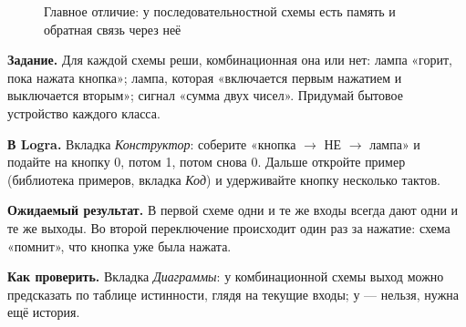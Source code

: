\begin{figure}[H]
\centering
{}
\caption{Главное отличие: у последовательностной схемы есть память и обратная
связь через неё}
\label{fig:comb_vs_seq}
\end{figure}

\begin{diybox}
\textbf{Задание.}  Для каждой схемы реши, комбинационная она или нет:
лампа «горит, пока нажата кнопка»; лампа, которая «включается первым
нажатием и выключается вторым»; сигнал «сумма двух чисел».
 Придумай бытовое устройство каждого класса.

\textbf{В Logra.} Вкладка \emph{Конструктор}: соберите «кнопка $\to$ НЕ $\to$
лампа» и подайте на кнопку 0, потом 1, потом снова 0. Дальше откройте
пример  (библиотека примеров, вкладка \emph{Код}) и
удерживайте кнопку несколько тактов.

\textbf{Ожидаемый результат.} В первой схеме одни и те же входы всегда дают
одни и те же выходы. Во второй переключение происходит один раз
за нажатие: схема «помнит», что кнопка уже была нажата.

\textbf{Как проверить.} Вкладка \emph{Диаграммы}: у комбинационной схемы
выход можно предсказать по таблице истинности, глядя на текущие входы;
у  --- нельзя, нужна ещё история.
\end{diybox}

